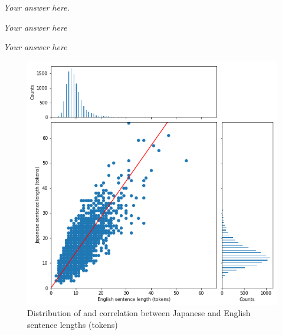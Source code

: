 \documentclass[answers]{exam}
\begin{document}
\begin{CJK}{UTF8}{min}
\begin{questions}
\begin{framed}
\emph{Your answer here.}
\end{framed}



\begin{framed}
\emph{Your answer here}
\end{framed}

\begin{framed}
\emph{Your answer here}
\end{framed}
\end{questions}

\noindent \hrulefill

\clearpage




\begin{figure}
  \centering
  \includegraphics[width=\linewidth]{fig-corr-toks}
  \caption[Sentence lenths (tokens)]%
  {Distribution of and correlation between Japanese and English sentence lengths (tokens)}
  \label{fig:corr-toks}
\end{figure}


\end{CJK}
\end{document}
